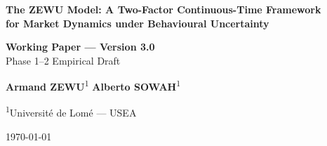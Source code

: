 \documentclass[12pt,a4paper]{article}
\theoremstyle{definition}
\theoremstyle{remark}
\begin{document}

\begin{titlepage}
  \begin{center}
    \vspace*{1.5cm}

    {\Large\textbf{\textcolor{zewublue}{
      The ZEWU Model: A Two-Factor Continuous-Time Framework\\[6pt]
      for Market Dynamics under Behavioural Uncertainty
    }}}

    \vspace{1.5cm}

    {\large \textbf{Working Paper --- Version 3.0}}\\[0.3cm]
    {\large \textcolor{zewugray}{Phase 1--2 Empirical Draft}}

    \vspace{1.5cm}

    {\large \textbf{Armand ZEWU}\textsuperscript{1}
      \quad \textbf{Alberto SOWAH}\textsuperscript{1}}

    \vspace{0.5cm}

    {\small \textsuperscript{1}Université de Lomé --- USEA}

    \vspace{0.8cm}

    {\small \textcolor{zewugray}{\today}}

    \vspace{2cm}


\end{center}
\end{titlepage}
\end{document}
